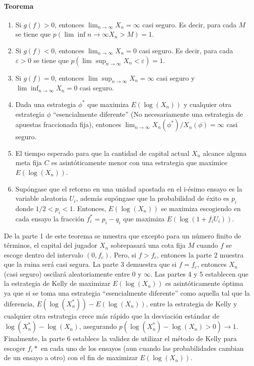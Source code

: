 \begin{itshape}

\paragraph{Teorema} %
\label{par:teorema}

\begin{enumerate}

	\item Si $g(f) > 0$, entonces $\lim_{n\to\infty}X_n = \infty$ casi seguro. Es decir, para cada $M$ se tiene que $p(\lim \inf{n\to\infty}X_n >M)=1$.

	\item Si $g(f) < 0$, entonces $\lim_{n\to\infty}X_n = 0$ casi seguro. Es decir, para cada $\varepsilon > 0 $ se tiene que $p(\lim \sup_{n\to\infty}X_n <\varepsilon)=1$.
	
	\item Si $g(f) = 0$, entonces $\lim \sup_{n\to\infty}X_n = \infty$ casi seguro y $\lim \inf_{n\to\infty}X_n = 0$ casi seguro.

	\item Dada una estrategia $\phi^*$ que maximiza $E(\log(X_n))$ y cualquier otra estrategia $\phi$ ``esencialmente diferente'' (No necesariamente una estrategia de apuestas fraccionada fija), entonces $\lim_{n\to\infty}X_n(\phi^*)/X_n(\phi)=\infty$ casi seguro.

	\item El tiempo esperado para que la cantidad de capital actual $X_n$ alcance alguna meta fija $C$ es asintóticamente menor con una estrategia que maximice $E(\log(X_n))$.

	\item Supóngase que el retorno en una unidad apostada en el i-ésimo ensayo es la variable aleatoria $U_i$, además supóngase que la probabilidad de éxito es $p_i$ donde $1/2 < p_i < 1$. Entonces, $E(\log(X_n))$ se maximiza escogiendo en cada ensayo la fracción $f_i^* = p_i -q_i$ que maximiza $E(\log(1+f_iU_i))$.

\end{enumerate}
\end{itshape}

De la parte 1 de este teorema se muestra que excepto para un número finito de términos, el capital del jugador $X_n$ sobrepasará una cota fija $M$ cuando $f$ se escoge dentro del intervalo $(0,f_c)$. Pero, si $f>f_c$, entonces la parte 2 muestra que la ruina será casi segura. La parte 3 demuestra que si $f=f_c$, entonces $X_n$ (casi seguro) oscilará aleatoriamente entre $0$ y $\infty$. Las partes 4 y 5 establecen que la estrategia de Kelly de maximizar $E(\log(X_n))$ es asintóticamente óptima ya que si se toma una estrategia ``esencialmente diferente'' como aquella tal que la diferencia, $E(\log(X_n^*)) - E(\log(X_n))$, entre la estrategia de Kelly y cualquier otra estrategia crece más rápido que la desviación estándar de $\log(X_n^*) - \log(X_n)$, asegurando $p(\log(X_n^*)-\log(X_n)>0) \to 1$. Finalmente, la parte 6 establece la validez de utilizar el método de Kelly para escoger $f_i*$ en cada uno de los ensayos (aun cuando las probabilidades cambian de un ensayo a otro) con el fin de maximizar $E(\log(X_n))$.

